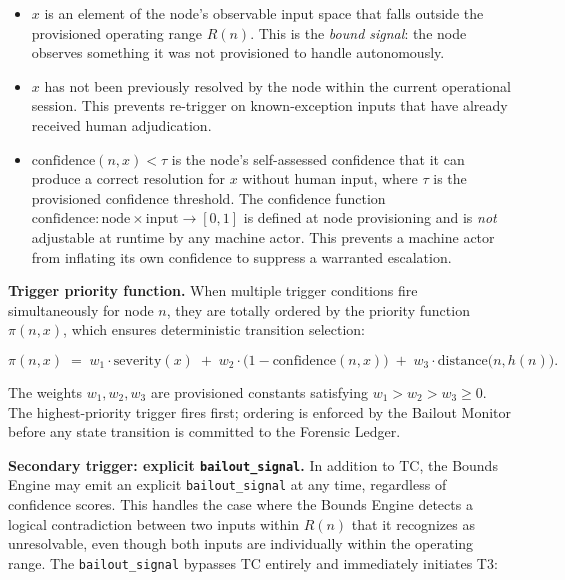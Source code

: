 \begin{itemize}\itemsep=0pt
\item[(i)] $x$ is an element of the node's observable input space that falls outside the provisioned operating range $R(n)$. This is the \emph{bound signal}: the node observes something it was not provisioned to handle autonomously.
\item[(ii)] $x$ has not been previously resolved by the node within the current operational session. This prevents re-trigger on known-exception inputs that have already received human adjudication.
\item[(iii)] $\text{confidence}(n, x) < \tau$ is the node's self-assessed confidence that it can produce a correct resolution for $x$ without human input, where $\tau$ is the provisioned confidence threshold. The confidence function $\text{confidence} : \text{node} \times \text{input} \rightarrow [0, 1]$ is defined at node provisioning and is \emph{not} adjustable at runtime by any machine actor. This prevents a machine actor from inflating its own confidence to suppress a warranted escalation.
\end{itemize}

\medskip\noindent\textbf{Trigger priority function.} When multiple trigger conditions fire simultaneously for node $n$, they are totally ordered by the priority function $\pi(n, x)$, which ensures deterministic transition selection:

\begin{equation}
\pi(n, x) \;=\; w_1 \cdot \text{severity}(x) \;+\; w_2 \cdot \bigl(1 - \text{confidence}(n, x)\bigr) \;+\; w_3 \cdot \text{distance}\bigl(n, h(n)\bigr). \tag{PF}
\end{equation}

The weights $w_1, w_2, w_3$ are provisioned constants satisfying $w_1 > w_2 > w_3 \geq 0$. The highest-priority trigger fires first; ordering is enforced by the Bailout Monitor before any state transition is committed to the Forensic Ledger.

\medskip\noindent\textbf{Secondary trigger: explicit \texttt{bailout\_signal}.} In addition to TC, the Bounds Engine may emit an explicit \texttt{bailout\_signal} at any time, regardless of confidence scores. This handles the case where the Bounds Engine detects a logical contradiction between two inputs within $R(n)$ that it recognizes as unresolvable, even though both inputs are individually within the operating range. The \texttt{bailout\_signal} bypasses TC entirely and immediately initiates T3:

